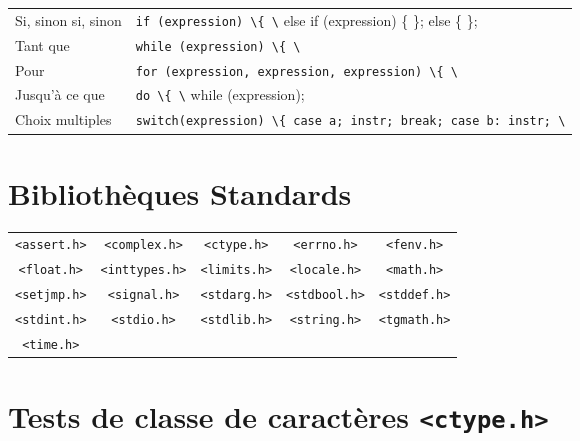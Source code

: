 \documentclass{article}
\newcommand{\cd}{\lstinline}
\begin{document}
\begin{multicols*}{3}
  \begin{tabularx}{\linewidth}{Xl}
  Si, sinon si, sinon & \cd[emph={expression}]{if (expression) \{ \} else if (expression) \{ \}; else \{ \};} \\
  Tant que & \cd[emph={expression}]{while (expression) \{ \}} \\
  Pour & \cd[emph={expression}]{for (expression, expression, expression) \{ \}} \\
  Jusqu'à ce que & \cd{do \{ \} while (expression);} \\
  Choix multiples & \cd{switch(expression) \{ case a; instr; break; case b: instr; \}} \\
  \end{tabularx}



\section*{Bibliothèques Standards}
  \begin{tabularx}{\linewidth}{ccccc}
    \cd{<assert.h>} & \cd{<complex.h>}  & \cd{<ctype.h>}  & \cd{<errno.h>}   & \cd{<fenv.h>} \\
    \cd{<float.h>}  & \cd{<inttypes.h>} & \cd{<limits.h>} & \cd{<locale.h>}  & \cd{<math.h>} \\
    \cd{<setjmp.h>} & \cd{<signal.h>}   & \cd{<stdarg.h>} & \cd{<stdbool.h>} & \cd{<stddef.h>} \\
    \cd{<stdint.h>} & \cd{<stdio.h>}    & \cd{<stdlib.h>} & \cd{<string.h>}  & \cd{<tgmath.h>} \\
    \cd{<time.h>}   &              &            &             & \\
  \end{tabularx}

\section*{Tests de classe de caractères \texttt{<ctype.h>}}


\end{multicols*}
\end{document}
